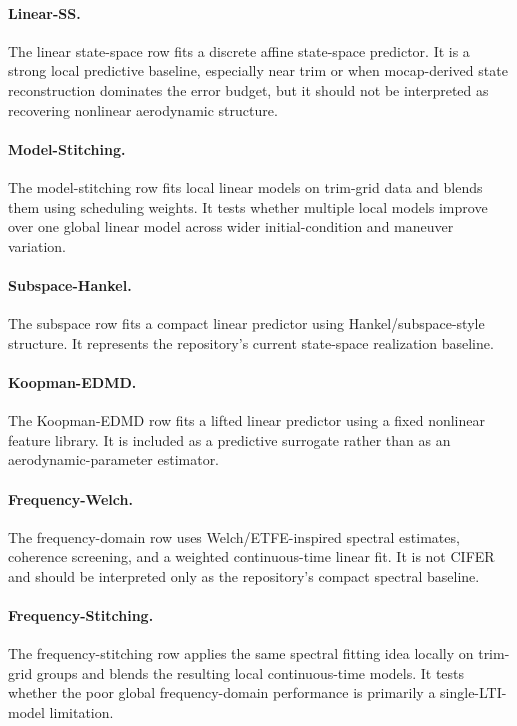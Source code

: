 \documentclass[11pt]{article}
\begin{document}
\paragraph{Linear-SS.}
The linear state-space row fits a discrete affine state-space predictor. It is a strong local predictive baseline, especially near trim or when mocap-derived state reconstruction dominates the error budget, but it should not be interpreted as recovering nonlinear aerodynamic structure.

\paragraph{Model-Stitching.}
The model-stitching row fits local linear models on trim-grid data and blends them using scheduling weights. It tests whether multiple local models improve over one global linear model across wider initial-condition and maneuver variation.

\paragraph{Subspace-Hankel.}
The subspace row fits a compact linear predictor using Hankel/subspace-style structure. It represents the repository's current state-space realization baseline.

\paragraph{Koopman-EDMD.}
The Koopman-EDMD row fits a lifted linear predictor using a fixed nonlinear feature library. It is included as a predictive surrogate rather than as an aerodynamic-parameter estimator.

\paragraph{Frequency-Welch.}
The frequency-domain row uses Welch/ETFE-inspired spectral estimates, coherence screening, and a weighted continuous-time linear fit. It is not CIFER and should be interpreted only as the repository's compact spectral baseline.

\paragraph{Frequency-Stitching.}
The frequency-stitching row applies the same spectral fitting idea locally on trim-grid groups and blends the resulting local continuous-time models. It tests whether the poor global frequency-domain performance is primarily a single-LTI-model limitation.
\end{document}

